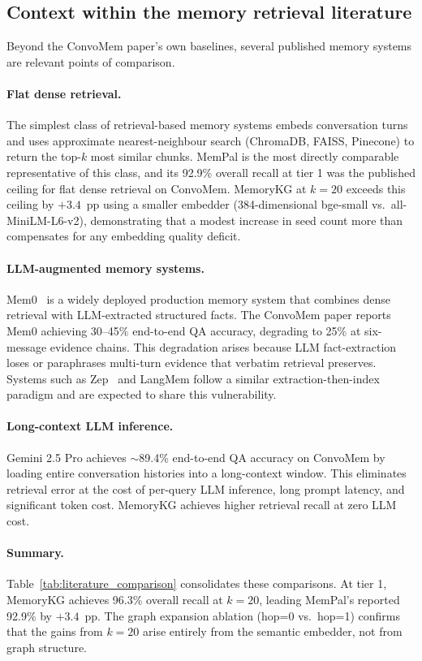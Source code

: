 \documentclass[11pt,a4paper]{article}
\begin{document}
\subsection{Context within the memory retrieval literature}

Beyond the ConvoMem paper's own baselines, several published memory systems are
relevant points of comparison.

\paragraph{Flat dense retrieval.}
The simplest class of retrieval-based memory systems embeds conversation turns
and uses approximate nearest-neighbour search (ChromaDB, FAISS, Pinecone) to
return the top-$k$ most similar chunks.
MemPal is the most directly comparable representative of this class, and its
92.9\% overall recall at tier 1 was the published ceiling for flat dense retrieval
on ConvoMem.
MemoryKG at $k{=}20$ exceeds this ceiling by $+3.4$~pp using a smaller embedder
(384-dimensional bge-small vs.\ all-MiniLM-L6-v2), demonstrating that a modest
increase in seed count more than compensates for any embedding quality deficit.

\paragraph{LLM-augmented memory systems.}
Mem0~\citep{mem0} is a widely deployed production memory system that combines
dense retrieval with LLM-extracted structured facts.
The ConvoMem paper reports Mem0 achieving 30--45\% end-to-end QA accuracy,
degrading to 25\% at six-message evidence chains.
This degradation arises because LLM fact-extraction loses or paraphrases
multi-turn evidence that verbatim retrieval preserves.
Systems such as Zep~\citep{zep} and LangMem follow a similar extraction-then-index
paradigm and are expected to share this vulnerability.

\paragraph{Long-context LLM inference.}
Gemini 2.5 Pro achieves $\sim$89.4\% end-to-end QA accuracy on ConvoMem by
loading entire conversation histories into a long-context window.
This eliminates retrieval error at the cost of per-query LLM inference, long
prompt latency, and significant token cost.
MemoryKG achieves higher retrieval recall at zero LLM cost.

\paragraph{Summary.}
Table~\ref{tab:literature_comparison} consolidates these comparisons.
At tier 1, MemoryKG achieves 96.3\% overall recall at $k{=}20$, leading MemPal's
reported 92.9\% by $+3.4$~pp.
The graph expansion ablation (hop=0 vs.\ hop=1) confirms that the gains from $k{=}20$
arise entirely from the semantic embedder, not from graph structure.
\end{document}
